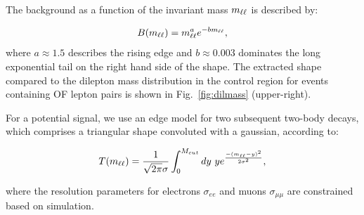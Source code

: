 The background as a function of the invariant mass $m_{\ell\ell}$ is described by:

\begin{equation}
B(m_{\ell\ell}) = m_{\ell\ell}^a e^{-b m_{\ell\ell}},
\end{equation}
where $a\approx1.5$ describes the rising edge and $b\approx0.003$
dominates the long exponential tail on the right hand side of the 
shape. The extracted shape compared to the dilepton mass distribution in the control region
for events containing OF lepton pairs is shown in Fig.~\ref{fig:dilmass} (upper-right).

For a potential signal, we use an edge model for two subsequent two-body decays, 
which comprises a triangular shape convoluted with a gaussian,
according to:

\begin{equation}
T(m_{\ell\ell}) = \frac{1}{\sqrt{2\pi}\sigma}\int_0^{M_{cut}} dy~y e^{\frac{-(m_{\ell\ell}-y)^2}{2\sigma^2}},
\end{equation}

where the resolution parameters for electrons $\sigma_{ee}$ and muons $\sigma_{\mu\mu}$ are constrained 
based on simulation.

